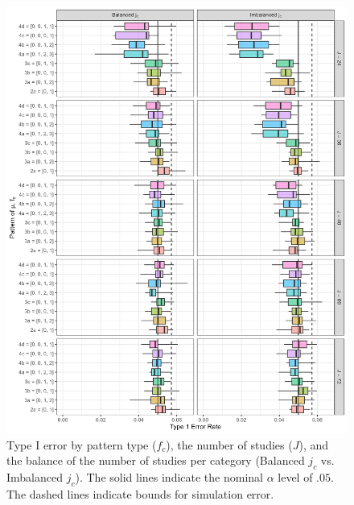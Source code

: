 \begin{figure}
    \centering
    \vspace{-5pt}\includegraphics[width=\linewidth]{chapters/plots/type1error_bal.png}\caption{Type I error by pattern type ($f_c$), the number of studies ($J$), and the balance of the number of studies per category (Balanced $j_c$ vs. Imbalanced $j_c$). The solid lines indicate the nominal  $\alpha$ level of $.05$. The dashed lines indicate bounds for simulation error.\label{fig: type1error_bal}}
    \vspace{-5pt}
\end{figure}



